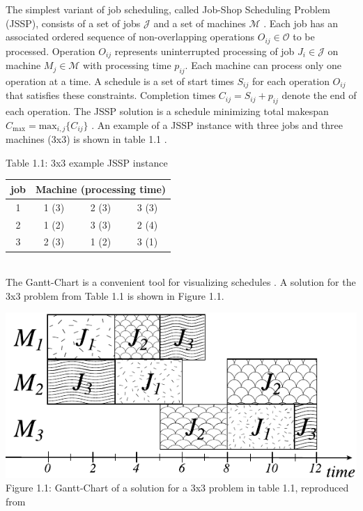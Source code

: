 The simplest variant of job scheduling, called Job-Shop Scheduling Problem (JSSP), consists of a set of jobs $\mathcal{J}$ and a set of machines $\mathcal{M}$ \cite{YamadaNakanoJSSP}. Each job has an associated ordered sequence of non-overlapping operations $O_{ij} \in \mathcal{O}$ to be processed. Operation ${O}_{ij}$ represents uninterrupted processing of job $J_i \in \mathcal{J}$ on machine $M_j \in \mathcal{M}$ with processing time $p_{ij}$. Each machine can process only one operation at a time. A schedule is a set of start times $S_{ij}$ for each operation $O_{ij}$ that satisfies these constraints. Completion times $C_{ij} = S_{ij} + p_{ij}$ denote the end of each operation. The JSSP solution is a schedule minimizing total makespan $C_\text{max} = \text{max}_{i,j} \{C_{ij}\}$ \cite{zhang2020learning}. An example of a JSSP instance with three jobs and three machines (3x3) is shown in table 1.1 \cite{YamadaNakanoJSSP}.
\begin{table}[htbp]
    Table 1.1: 3x3 example JSSP instance \cite{YamadaNakanoJSSP}\\
    \vspace{1mm}
    \begin{tabular}{cccc}
    \hline
    job & \multicolumn{3}{c}{Machine (processing time)} \\ \hline
    1   & 1 (3)             & 2 (3)             & 3 (3)            \\
    2   & 1 (2)             & 3 (3)             & 2 (4)            \\
    3   & 2 (3)             & 1 (2)             & 3 (1)            \\ \hline
    \end{tabular}
\end{table}\\
The Gantt-Chart is a convenient tool for visualizing schedules \cite{WILSON2003430}. A solution for the 3x3 problem from Table 1.1 is shown in Figure 1.1.
\begin{center}
    \includegraphics[width=0.8\linewidth]{images/gantt-charrt.pdf}\\
    Figure 1.1: Gantt-Chart of a solution for a 3x3 problem in table 1.1, reproduced from \cite{YamadaNakanoJSSP}
\end{center}

